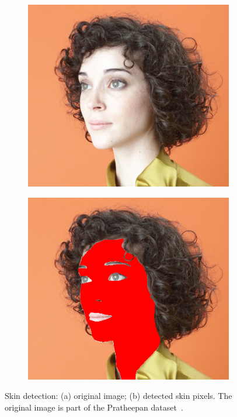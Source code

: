 \begin{figure}[hb]
     \centering
     \begin{subfigure}[b]{0.45\textwidth}
         \centering
         \includegraphics[width=\textwidth]{images/introduction/skin_det_ori3.jpg}
         \caption{}
         \label{fig:skin-detection-ori}
     \end{subfigure}
     \hfill
     \begin{subfigure}[b]{0.45\textwidth}
         \centering
         \includegraphics[width=\textwidth]{images/introduction/skin_det_red3.png}
         \caption{}
         \label{fig:skin-detection-red}
     \end{subfigure}
        \caption{Skin detection: (a) original image; (b) detected skin pixels. The original image is part of the Pratheepan dataset~\cite{tan2011fusion}.}
        \label{fig:skin-detection}
\end{figure}


